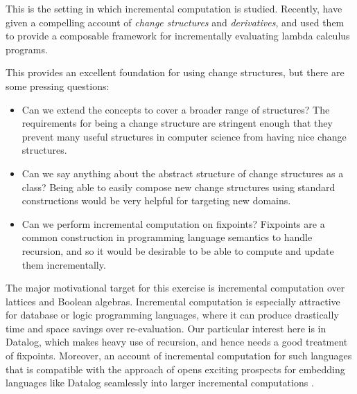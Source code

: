 This is the setting in which incremental computation is studied. Recently,
\textcite{cai2014changes} have given a compelling account
of \textit{change structures} and \textit{derivatives}, and used them to provide
a composable framework for incrementally evaluating lambda calculus programs.

This provides an excellent foundation for using change structures, but there are
some pressing questions:
\begin{itemize}
  \item Can we extend the concepts to cover a broader range of structures?
    The requirements for being a change structure are stringent enough that they
    prevent many useful structures in computer science from having nice change structures.
  \item Can we say anything about the abstract structure of change structures as
    a class? Being able to easily compose new change structures using standard
    constructions would be very helpful for targeting new domains.
  \item Can we perform incremental computation on fixpoints? Fixpoints are a
    common construction in programming language semantics to handle recursion,
    and so it would be desirable to be able to compute and update them incrementally.
\end{itemize}

The major motivational target for this exercise is incremental computation over
lattices and Boolean algebras. Incremental computation is especially attractive
for database or logic programming languages, where it can
produce drastically time and space savings over re-evaluation. Our particular
interest here is in Datalog, which makes heavy use of recursion, and hence needs
a good treatment of fixpoints. Moreover, an
account of incremental computation for such languages that is compatible with
the approach of \textcite{cai2014changes} opens exciting prospects for embedding
languages like Datalog seamlessly into larger incremental computations
\autocite[See][]{arntz2016datafun}.

